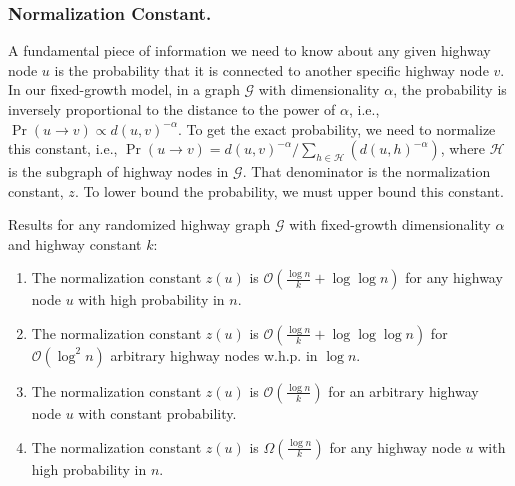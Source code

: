 \subsubsection{Normalization Constant.}
%
A fundamental piece of information we need to know about any given
highway node $u$ is the probability that it is connected to another specific
highway node $v$.
In our fixed-growth model, in a graph $\mathcal{G}$ with dimensionality
$\alpha$, the probability is inversely proportional to the distance to the
power of $\alpha$, i.e., $\Pr(u \to v) \propto d(u, v)^{-\alpha}$.
To get the exact probability, we need to normalize this constant, i.e.,
$\Pr(u \to v) = d(u, v)^{-\alpha} / \sum_{h \in \mathcal H}(d(u, h)^{-\alpha})$, where
$\mathcal H$ is the subgraph of highway nodes in $\mathcal G$.
That denominator is the normalization constant, $z$. 
To lower bound
the probability, we must upper bound this constant.

\begin{lemma} \label{lem:z}
    Results for any randomized highway graph $\mathcal{G}$ with fixed-growth
    dimensionality $\alpha$ and highway constant $k$:
    \begin{enumerate}
        \item The normalization constant $z(u)$ is
        $\mathcal{O}(\frac{\log{n}}{k} + \log{\log{n}})$ for any highway node
        $u$ with high probability in $n$. \label{lem:z:always}

        \item The normalization constant $z(u)$ is
        $\mathcal{O}(\frac{\log{n}}{k} + \log{\log{\log{n}}})$ for
        $\mathcal{O}(\log^2{n})$ arbitrary highway nodes w.h.p. in $\log{n}$. \label{lem:z:log}

        \item The normalization constant $z(u)$ is
        $\mathcal{O}(\frac{\log{n}}{k})$ for an arbitrary highway node $u$
        with constant probability. \label{lem:z:constant}

        \item The normalization constant $z(u)$ is $\Omega(\frac{\log{n}}{k})$
        for any highway node $u$ with high probability in $n$.
        \label{lem:z:lower-always}
    \end{enumerate}
\end{lemma}

